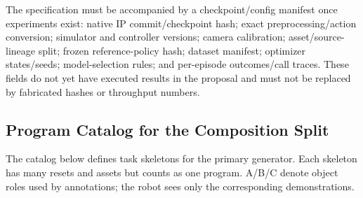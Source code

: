 \documentclass[
  10pt,
]{article}
\begin{document}
The specification must be accompanied by a checkpoint/config manifest once experiments exist: native IP commit/checkpoint hash; exact preprocessing/action conversion; simulator and controller versions; camera calibration; asset/source-lineage split; frozen reference-policy hash; dataset manifest; optimizer states/seeds; model-selection rules; and per-episode outcomes/call traces. These fields do not yet have executed results in the proposal and must not be replaced by fabricated hashes or throughput numbers.

\hypertarget{danh-mux1ee5c-program-cho-split-composition}{%
\subsection{Program Catalog for the Composition Split}\label{danh-mux1ee5c-program-cho-split-composition}}

The catalog below defines task skeletons for the primary generator. Each skeleton has many resets and assets but counts as one program. A/B/C denote object roles used by annotations; the robot sees only the corresponding demonstrations.
\end{document}
